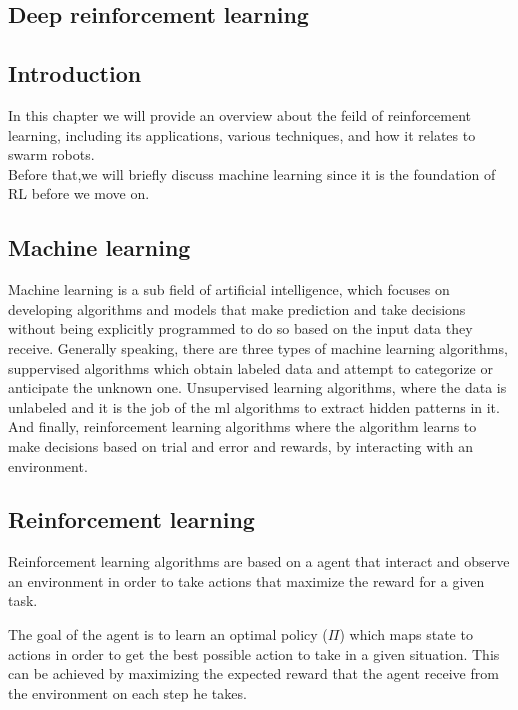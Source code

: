 \documentclass[12pt]{extarticle}
\begin{document}
\newpage
\pagebreak
\hspace{0pt}
\vfill
\begin{center}
\section{Deep reinforcement learning}
\end{center}
\vfill
\hspace{0pt}

\pagebreak

\subsection{Introduction}
In this chapter we will provide an overview about the feild of reinforcement learning, including its applications, various techniques, and how it relates to swarm robots.\\
Before that,we will briefly discuss machine learning since it is the foundation of RL before we move on.
\subsection{Machine learning}
Machine learning is a sub field of artificial intelligence, which
focuses on developing algorithms and models that make prediction and take decisions without being explicitly programmed to do so
based on the input data they receive.
Generally speaking, there are three types of machine learning algorithms,
suppervised algorithms which obtain labeled data and attempt to categorize or anticipate the unknown one. Unsupervised learning algorithms, where the  data is unlabeled and it is the job of the ml algorithms  to extract  hidden patterns in it. And finally, reinforcement learning algorithms  where the algorithm learns to make decisions based on trial and error and rewards, by interacting with an environment.

\subsection{Reinforcement learning}
Reinforcement learning algorithms are based on a agent that interact and observe  an environment in order to take actions that maximize the reward for a given task.

The goal of the agent is to learn an optimal policy ($\Pi$) which maps state to actions in order to get the best possible action to take in a given situation. This can be achieved  by maximizing the expected  reward that the agent receive from the environment on each step he takes.\cite{arulkumaran2017brief}
\end{document}
